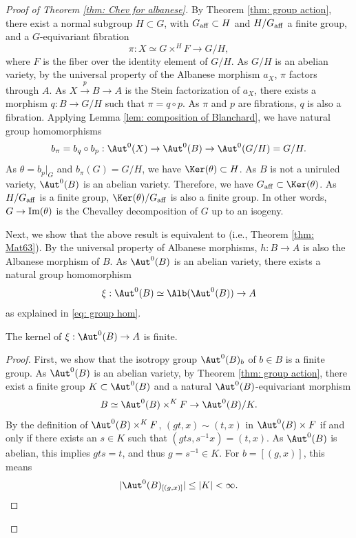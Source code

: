 \documentclass[11pt]{amsart}
\begin{document}
\begin{proof}[Proof of Theorem \ref{thm: Chev for albanese}]
By Theorem \ref{thm: group action}, there exist a normal subgroup $H \subset G$, with $G_{\rm aff} \subset H$ and $H/G_{\rm aff}$ a finite group, and a $G$-equivariant fibration
\[
\pi: X \simeq G \times^H F \to G/H,
\] where $F$ is the fiber over the identity element of $G/H$. As $G/H$ is an abelian variety, by the universal property of the Albanese morphism $a_X$, $\pi$ factors through $A$. As $X \xrightarrow{p} B \to A$ is the Stein factorization of $a_X$, there exists a morphism $q: B \to G/H$ such that $\pi= q \circ p$. As $\pi$ and $p$ are fibrations, $q$ is also a fibration. Applying Lemma \ref{lem: composition of Blanchard}, we have natural group homomorphisms
\[
b_\pi = b_q \circ b_p: \Aut^0(X) \to \Aut^0(B) \to \Aut^0(G/H)=G/H.
\] As $\theta = b_p|_{G}$ and $b_\pi (G) = G/H$, we have $\Ker(\theta) \subset H$. As $B$ is not a uniruled variety, $\Aut^0(B)$ is an abelian variety. Therefore, we have $G_{\rm aff} \subset \Ker(\theta)$. As $H/G_{\rm aff}$ is a finite group, $\Ker(\theta)/G_{\rm aff}$ is also a finite group. In other words, $G \to  {\rm Im}(\theta)$ is the Chevalley decomposition of $G$ up to an isogeny.

Next, we show that the above result is equivalent to \cite[Theorem 2]{Mat63} (i.e., Theorem \ref{thm: Mat63}). By the universal property of Albanese morphisms, $h: B \to A$ is also the Albanese morphism of $B$. As $\Aut^0(B)$ is an abelian variety, there exists a natural group homomorphism 
 \[
 \xi: \Aut^0(B) \simeq \Alb(\Aut^0(B)) \to A
 \] as explained in \eqref{eq: group hom}.
 
 \begin{claim}\label{claim: finite kernel}
  The kernel of $\xi: \Aut^0(B) \to A$ is finite.
 \end{claim}
 \begin{proof}
 First, we show that the isotropy group $\Aut^0(B)_b$ of $b\in B$ is a finite group. As $\Aut^0(B)$ is an abelian variety, by Theorem \ref{thm: group action}, there exist a finite group $K\subset \Aut^0(B)$ and a natural $\Aut^0(B)$-equivariant morphism
 \[
 B \simeq \Aut^0(B) \times^K F \to \Aut^0(B)/K.
 \] By the definition of $\Aut^0(B) \times^K F $, $(gt, x) \sim (t,x)$ in $\Aut^0(B) \times F $ if and only if there exists an $s\in K$ such that $(gts,s^{-1}x)=(t,x)$. As $\Aut^0(B)$ is abelian, this implies $gts=t$, and thus $g=s^{-1}\in K$. For $b=[(g, x)]$, this means
 \[
 |\Aut^0(B)_{[(g,x)]}| \leq |K|<\infty.
 \]


\end{proof}
\end{proof}
\end{document}
